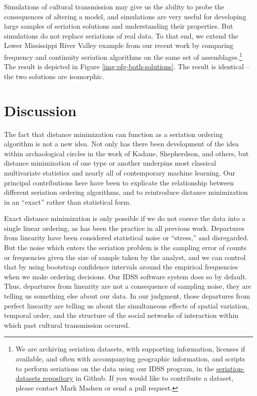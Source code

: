 \documentclass[graybox,natbib]{svmult}
\begin{document}
Simulations of cultural transmission may give us the ability to probe
the consequences of altering a model, and simulations are very useful
for developing large samples of seriation solutions and understanding
their properties. But simulations do not replace seriations of real
data. To that end, we extend the Lower Mississippi River Valley example
from our recent work \citep{lipomadsendunnell2015} by comparing
frequency and continuity seriation algorithms on the same set of
assemblages.\footnote{We are archiving seriation datasets, with
  supporting information, licenses if available, and often with
  accompanying geographic information, and scripts to perform seriations
  on the data using our IDSS program, in the
  \href{https://github.com/mmadsen/seriation-datasets}{seriation-datasets
  repository} in Github. If you would like to contribute a dataset,
  please contact Mark Madsen or send a pull request.} The result is
depicted in Figure \ref{img:pfg-both-solutions}. The result is identical
-- the two solutions are isomorphic.

\section{Discussion}\label{discussion}

The fact that distance minimization can function as a seriation ordering
algorithm is not a new idea. Not only has there been development of the
idea within archaological circles in the work of Kadane, Shepherdson,
and others, but distance minimization of one type or another underpins
most classical multivariate statistics and nearly all of contemporary
machine learning. Our principal contributions here have been to
explicate the relationship between different seriation ordering
algorithms, and to reintroduce distance minimization in an ``exact''
rather than statistical form.

Exact distance minimization is only possible if we do not coerce the
data into a single linear ordering, as has been the practice in all
previous work. Departures from linearity have been considered
statistical noise or ``stress,'' and disregarded. But the noise which
enters the seriation problem is the sampling error of counts or
frequencies given the size of sample taken by the analyst, and we can
control that by using bootstrap confidence intervals around the
empirical frequencies when we make ordering decisions. Our IDSS software
system does so by default. Thus, departures from linearity are not a
consequence of sampling noise, they are telling us something else about
our data. In our judgment, those departures from perfect linearity are
telling us about the simultaneous effects of spatial variation, temporal
order, and the structure of the social networks of interaction within
which past cultural transmission occured.
\end{document}
